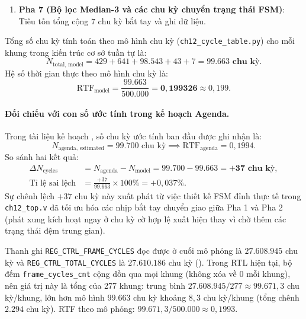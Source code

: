\begin{enumerate}
    \item \textbf{Pha 7 (Bộ lọc Median-3 và các chu kỳ chuyển trạng thái FSM)}:
    Tiêu tốn tổng cộng $7\text{ chu kỳ}$ bắt tay và ghi dữ liệu.
\end{enumerate}

Tổng số chu kỳ tính toán theo mô hình chu kỳ (\texttt{ch12\_cycle\_table.py}) cho mỗi khung trong kiến trúc cơ sở tuần tự là:
\begin{equation}
    N_{\text{total, model}} = 429 + 641 + 98.543 + 43 + 7 = \mathbf{99.663\text{ chu kỳ}}.
\end{equation}
Hệ số thời gian thực theo mô hình chu kỳ là:
\begin{equation}
    \text{RTF}_{\text{model}} = \frac{99.663}{500.000} = \mathbf{0{,}199326} \approx 0{,}199.
\end{equation}

\paragraph{Đối chiếu với con số ước tính trong kế hoạch Agenda.}
Trong tài liệu kế hoạch , số chu kỳ ước tính ban đầu được ghi nhận là:
\begin{equation}
    N_{\text{agenda, estimated}} = 99.700\text{ chu kỳ} \implies \text{RTF}_{\text{agenda}} = 0{,}1994.
\end{equation}
So sánh hai kết quả:
\begin{align}
    \Delta N_{\text{cycles}} &= N_{\text{agenda}} - N_{\text{model}} = 99.700 - 99.663 = \mathbf{+37\text{ chu kỳ}}, \\
    \text{Tỉ lệ sai lệch} &= \frac{+37}{99.663} \times 100\% = +0{,}037\%.
\end{align}
Sự chênh lệch $+37\text{ chu kỳ}$ này xuất phát từ việc thiết kế FSM đỉnh thực tế trong \texttt{ch12\_top.v} đã tối ưu hóa các nhịp bắt tay chuyển giao giữa Pha 1 và Pha 2 (phát xung kích hoạt ngay ở chu kỳ cờ hợp lệ xuất hiện thay vì chờ thêm các trạng thái đệm trung gian).
\begin{tcolorbox}[colback=green!4,colframe=green!45!black,title={Kết quả mô phỏng Icarus Verilog (người bình duyệt chạy, tệp sạch 277 khung)}]
Thanh ghi \texttt{REG\_CTRL\_FRAME\_CYCLES} đọc được ở cuối mô phỏng là $27.608.945$ chu kỳ và \texttt{REG\_CTRL\_TOTAL\_CYCLES} là $27.610.186$ chu kỳ (). Trong RTL hiện tại, bộ đếm \texttt{frame\_cycles\_cnt} cộng dồn qua mọi khung (không xóa về 0 mỗi khung), nên giá trị này là tổng của 277 khung: trung bình $27.608.945/277 \approx 99.671{,}3$ chu kỳ/khung, lớn hơn mô hình $99.663$ chu kỳ khoảng $8{,}3$ chu kỳ/khung (tổng chênh $2.294$ chu kỳ). RTF theo mô phỏng: $99.671{,}3/500.000 \approx 0{,}1993$.
\end{tcolorbox}

